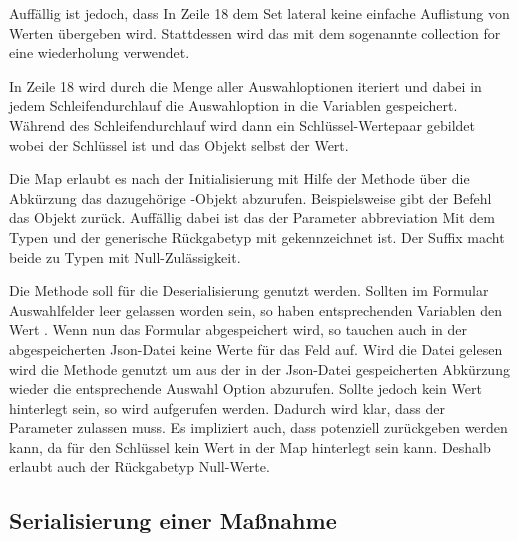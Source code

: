 Auffällig ist jedoch, dass In Zeile 18 dem Set lateral keine einfache Auflistung von Werten übergeben wird. Stattdessen wird das mit dem sogenannte collection for eine wiederholung verwendet.



In Zeile 18 wird durch die  Menge aller Auswahloptionen  iteriert und dabei in jedem Schleifendurchlauf die Auswahloption in die Variablen  gespeichert. Während des Schleifendurchlauf wird dann ein Schlüssel-Wertepaar gebildet wobei  der Schlüssel ist und das Objekt  selbst der Wert.

Die Map  erlaubt es nach der Initialisierung mit Hilfe der Methode   über die Abkürzung das dazugehörige -Objekt abzurufen. Beispielsweise gibt der Befehl  das Objekt  zurück. Auffällig dabei ist das der Parameter abbreviation Mit dem Typen  und der generische Rückgabetyp mit  gekennzeichnet ist. Der Suffix  macht beide zu Typen mit Null-Zulässigkeit.



Die Methode  soll für die Deserialisierung genutzt werden.  Sollten im Formular Auswahlfelder leer gelassen worden sein, so haben  entsprechenden Variablen den Wert . Wenn nun das Formular abgespeichert wird, so tauchen auch in der abgespeicherten Json-Datei keine Werte für das Feld auf. Wird die Datei gelesen wird die Methode  genutzt um aus der in der Json-Datei gespeicherten Abkürzung wieder die entsprechende Auswahl Option abzurufen. Sollte jedoch kein Wert hinterlegt sein, so wird  aufgerufen werden. Dadurch wird klar, dass der Parameter  zulassen muss. Es impliziert auch, dass potenziell  zurückgeben werden kann, da für den Schlüssel  kein Wert in der Map hinterlegt sein kann. Deshalb  erlaubt auch der Rückgabetyp  Null-Werte.





\clearpage
\subsection{Serialisierung einer Maßnahme}

